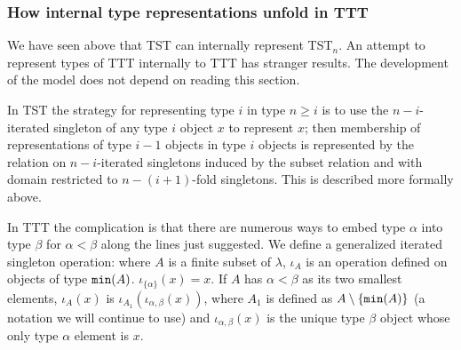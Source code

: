 \documentclass[112pt]{article}
\begin{document}
\newpage



\subsubsection{How internal type representations unfold in TTT}

We have seen above that TST can internally represent TST$_n$.   An attempt to represent types of TTT internally to TTT has stranger results.  The development of the model does not depend on reading this section.

In TST the strategy for representing type $i$ in type $n\geq i$  is to use the $n-i$-iterated singleton of any type $i$ object $x$ to represent $x$;  then membership of representations of type $i-1$ objects in type
$i$ objects is represented by the relation on $n-i$-iterated singletons induced by the subset relation and with domain restricted to $n-(i+1)$-fold singletons.  This is described more formally above.

In TTT the complication is that there are numerous ways to embed type $\alpha$ into type $\beta$ for $\alpha<\beta$ along the lines just suggested.    We define a generalized
iterated singleton operation:  where $A$ is a finite subset of $\lambda$, $\iota_A$ is an operation defined on objects of type ${\tt min}(A)$.  $\iota_{\{\alpha\}}(x)=x$.
If $A$ has $\alpha<\beta$ as its two smallest elements, $\iota_A(x)$ is  $\iota_{A_1}(\iota_{\alpha,\beta}(x))$, where $A_1$ is defined as $A \setminus \{{\tt min}(A)\}$ (a notation we will continue to use) and $\iota_{\alpha,\beta}(x)$ is the unique type $\beta$ object whose only type $\alpha$ element is $x$.
\end{document}
